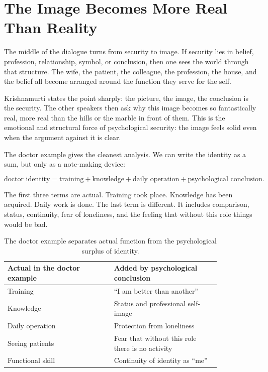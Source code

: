 \section{The Image Becomes More Real Than Reality}

The middle of the dialogue turns from security to image. If security lies in belief, profession, relationship, symbol, or conclusion, then one sees the world through that structure. The wife, the patient, the colleague, the profession, the house, and the belief all become arranged around the function they serve for the self.

Krishnamurti states the point sharply: the picture, the image, the conclusion is the security. The other speakers then ask why this image becomes so fantastically real, more real than the hills or the marble in front of them. This is the emotional and structural force of psychological security: the image feels solid even when the argument against it is clear.

The doctor example gives the cleanest analysis. We can write the identity as a sum, but only as a note-making device:

\begin{equation}
\text{doctor identity}
=
\text{training}
+
\text{knowledge}
+
\text{daily operation}
+
\text{psychological conclusion}.
\end{equation}

The first three terms are actual. Training took place. Knowledge has been acquired. Daily work is done. The last term is different. It includes comparison, status, continuity, fear of loneliness, and the feeling that without this role things would be bad.

\begin{table}
\centering
\begin{tabular}{|p{0.42\linewidth}|p{0.42\linewidth}|}
\hline
\textbf{Actual in the doctor example} & \textbf{Added by psychological conclusion} \\
\hline
Training & ``I am better than another'' \\
\hline
Knowledge & Status and professional self-image \\
\hline
Daily operation & Protection from loneliness \\
\hline
Seeing patients & Fear that without this role there is no activity \\
\hline
Functional skill & Continuity of identity as ``me'' \\
\hline
\end{tabular}
\caption{The doctor example separates actual function from the psychological surplus of identity.}
\end{table}

